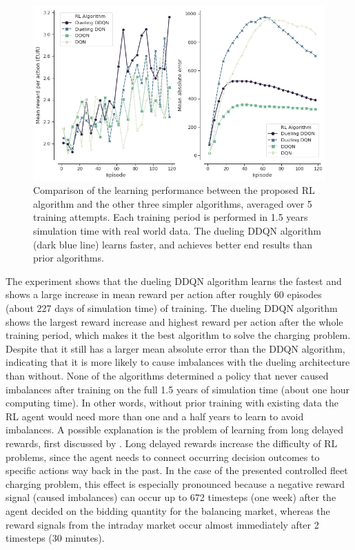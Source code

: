 \documentclass[a4paper, 12pt]{article}
\let\textcite\shortciteA
\begin{document}
\begin{figure}[h]
\centering
\includegraphics[width=1\linewidth]{fig/rl-learning.png}
\caption[Comparison of RL algorithm learning performance]{Comparison of the learning performance between the proposed RL algorithm and the other three simpler algorithms, averaged over 5 training attempts. Each training period is performed in 1.5 years simulation time with real world data. The dueling DDQN algorithm (dark blue line) learns faster, and achieves better end results than prior algorithms. \label{fig-rl-learning}}
\end{figure}

The experiment shows that the dueling DDQN algorithm learns the fastest and
shows a large increase in mean reward per action after roughly 60 episodes
(about 227 days of simulation time) of training. The dueling DDQN algorithm
shows the largest reward increase and highest reward per action after the whole
training period, which makes it the best algorithm to solve the charging
problem. Despite that it still has a larger mean absolute error than the DDQN
algorithm, indicating that it is more likely to cause imbalances with the
dueling architecture than without. None of the algorithms determined a policy
that never caused imbalances after training on the full 1.5 years of simulation
time (about one hour computing time). In other words, without prior training
with existing data the RL agent would need more than one and a half years to
learn to avoid imbalances. A possible explanation is the problem of learning
from long delayed rewards, first discussed by
\textcite{watkins89_learn_from_delay_rewar}. Long delayed rewards increase the
difficulty of RL problems, since the agent needs to connect occurring decision
outcomes to specific actions way back in the past. In the case of the presented
controlled fleet charging problem, this effect is especially pronounced because
a negative reward signal (caused imbalances) can occur up to 672 timesteps (one
week) after the agent decided on the bidding quantity for the balancing market,
whereas the reward signals from the intraday market occur almost immediately
after 2 timesteps (30 minutes).
\end{document}
